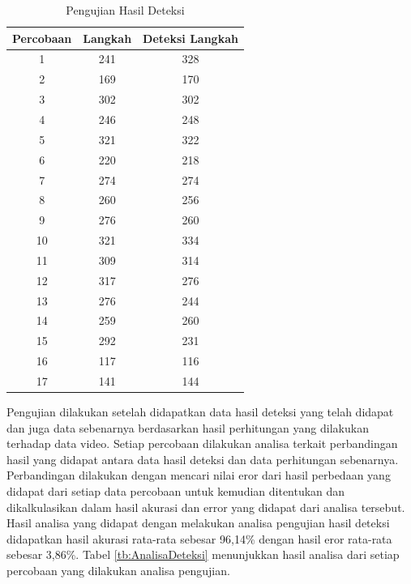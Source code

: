 \begin{longtable}{|c|c|c|}
  \caption{Pengujian Hasil Deteksi}
  \label{tb:PengujianDeteksi}                                   \\
  \hline
  \rowcolor[HTML]{C0C0C0}
  \textbf{Percobaan} & \textbf{Langkah} & \textbf{Deteksi Langkah} \\
  \hline
  1   & 241   & 328    \\
  \hline
  2   & 169   & 170    \\
  \hline
  3   & 302   & 302    \\
  \hline
  4   & 246   & 248    \\
  \hline
  5   & 321   & 322    \\
  \hline
  6   & 220   & 218    \\
  \hline
  7   & 274   & 274    \\
  \hline
  8   & 260   & 256    \\
  \hline
  9   & 276   & 260    \\
  \hline
  10   & 321   & 334    \\
  \hline
  11   & 309   & 314    \\
  \hline
  12   & 317   & 276    \\
  \hline
  13   & 276   & 244    \\
  \hline
  14   & 259   & 260    \\
  \hline
  15   & 292   & 231    \\
  \hline
  16   & 117   & 116    \\
  \hline
  17   & 141   & 144    \\
  \hline
\end{longtable}

Pengujian dilakukan setelah didapatkan data hasil deteksi yang telah didapat dan juga data sebenarnya berdasarkan hasil perhitungan yang dilakukan terhadap data video. Setiap percobaan dilakukan analisa terkait perbandingan hasil yang didapat antara data hasil deteksi dan data perhitungan sebenarnya. Perbandingan dilakukan dengan mencari nilai eror dari hasil perbedaan yang didapat dari setiap data percobaan untuk kemudian ditentukan dan dikalkulasikan dalam hasil akurasi dan error yang didapat dari analisa tersebut. Hasil analisa yang didapat dengan melakukan analisa pengujian hasil deteksi didapatkan hasil akurasi rata-rata sebesar 96,14\% dengan hasil eror rata-rata sebesar 3,86\%. Tabel \ref{tb:AnalisaDeteksi} menunjukkan hasil analisa dari setiap percobaan yang dilakukan analisa pengujian.

